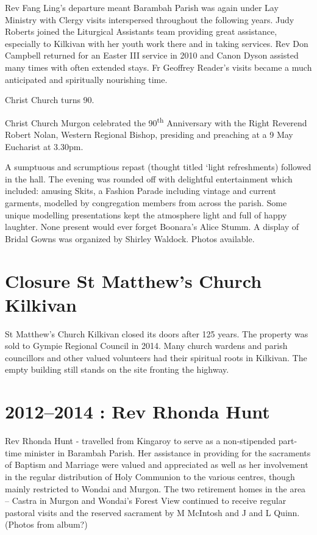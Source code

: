 Rev Fang Ling's departure meant Barambah Parish was again under Lay Ministry with Clergy visits interspersed throughout the following years. Judy Roberts joined the Liturgical Assistants team providing great assistance, especially to Kilkivan with her youth work there and in taking services. Rev Don Campbell returned for an Easter III service in 2010 and Canon Dyson assisted many times with often extended stays. Fr Geoffrey Reader's visits became a much anticipated and spiritually nourishing time.

Christ Church turns 90.

Christ Church Murgon celebrated the 90\textsuperscript{th} Anniversary with the Right Reverend Robert Nolan, Western Regional Bishop, presiding and preaching at a 9 May Eucharist at 3.30pm.

A sumptuous and scrumptious repast (thought titled `light refreshments) followed in the hall. The evening was rounded off with delightful entertainment which included: amusing Skits, a Fashion Parade including vintage and current garments, modelled by congregation members from across the parish. Some unique modelling presentations kept the atmosphere light and full of happy laughter. None present would ever forget Boonara's Alice Stumm. A display of Bridal Gowns was organized by Shirley Waldock. Photos available.

\hypertarget{closure-st-matthews-church-kilkivan}{%
\section{Closure St Matthew's Church Kilkivan}\label{closure-st-matthews-church-kilkivan}}

St Matthew's Church Kilkivan closed its doors after 125 years. The property was sold to Gympie Regional Council in 2014. Many church wardens and parish councillors and other valued volunteers had their spiritual roots in Kilkivan. The empty building still stands on the site fronting the highway.

\hypertarget{rev-rhonda-hunt}{%
\section{2012--2014 : Rev Rhonda Hunt}\label{rev-rhonda-hunt}}

Rev Rhonda Hunt - travelled from Kingaroy to serve as a non-stipended part-time minister in Barambah Parish. Her assistance in providing for the sacraments of Baptism and Marriage were valued and appreciated as well as her involvement in the regular distribution of Holy Communion to the various centres, though mainly restricted to Wondai and Murgon. The two retirement homes in the area -- Castra in Murgon and Wondai's Forest View continued to receive regular pastoral visits and the reserved sacrament by M McIntosh and J and L Quinn. (Photos from album?)

